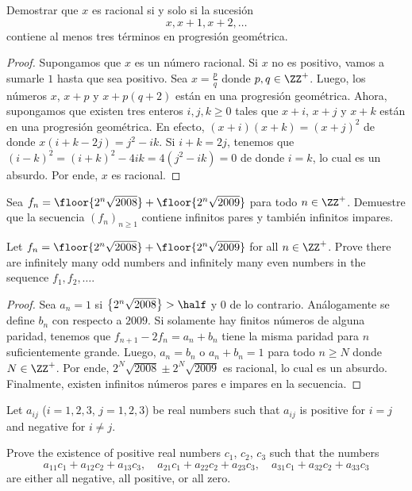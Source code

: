 
\begin{probEG}
	Demostrar que $x$ es racional si y solo si la sucesión
	\[x,x+1,x+2,\dots\]
	contiene al menos tres términos en progresión geométrica.
\end{probEG}

\begin{proof}
	Supongamos que $x$ es un número racional. Si $x$ no es positivo, vamos a sumarle $1$ hasta que sea positivo. Sea $x=\frac pq$ donde $p,q\in\ZZ^+$. Luego, los números $x$, $x+p$ y $x+p(q+2)$ están en una progresión geométrica. Ahora, supongamos que existen tres enteros $i,j,k\ge 0$ tales que $x+i$, $x+j$ y $x+k$ están en una progresión geométrica. En efecto, $(x+i)(x+k)=(x+j)^2$ de donde $x(i+k-2j)=j^2-ik$. Si $i+k=2j$, tenemos que $(i-k)^2=(i+k)^2-4ik=4(j^2-ik)=0$ de donde $i=k$, lo cual es un absurdo. Por ende, $x$ es racional.
\end{proof}

\begin{probEG}[CGMO 2008/8]
	Sea $f_n=\floor{2^n\sqrt{2008}}+\floor{2^n\sqrt{2009}}$ para todo $n\in\ZZ^+$. Demuestre que la secuencia $(f_n)_{n\ge 1}$ contiene infinitos pares y también infinitos impares.
	\begin{hint}
		Let $f_n=\floor{2^n\sqrt{2008}}+\floor{2^n\sqrt{2009}}$ for all $n\in\ZZ^+$. Prove there are infinitely many odd numbers and infinitely many even numbers in the sequence $f_1,f_2,\dots$.
	\end{hint}
\end{probEG}

\begin{proof}
	Sea $a_n=1$ si $\left\{2^n\sqrt{2008}\right\}>\half$ y $0$ de lo contrario. Análogamente se define $b_n$ con respecto a $2009$. Si solamente hay finitos números de alguna paridad, tenemos que $f_{n+1}-2f_n=a_n+b_n$ tiene la misma paridad para $n$ suficientemente grande. Luego, $a_n=b_n$ o $a_n+b_n=1$ para todo $n\ge N$ donde $N\in\ZZ^+$. Por ende, $2^N\sqrt{2008}\pm2^N\sqrt{2009}$ es racional, lo cual es un absurdo. Finalmente, existen infinitos números pares e impares en la secuencia.
\end{proof}


\begin{probEB}
	Let $a_{ij}$ ($i=1,2,3$, $j=1,2,3$) be real numbers such that $a_{ij}$ is positive for $i=j$ and negative for $i\ne j$.

	Prove the existence of positive real numbers $c_{1}$, $c_{2}$, $c_{3}$ such that the numbers
	\[a_{11}c_{1}+a_{12}c_{2}+a_{13}c_{3},\quad a_{21}c_{1}+a_{22}c_{2}+a_{23}c_{3},\quad a_{31}c_{1}+a_{32}c_{2}+a_{33}c_{3}\]
	are either all negative, all positive, or all zero.
\end{probEB}

